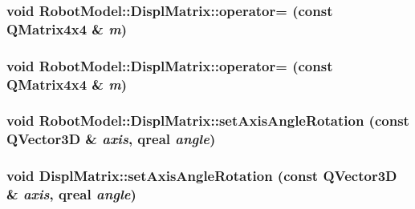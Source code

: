 \label{class_robot_model_1_1_displ_matrix_a337c49b52435255a7f36966c7047f6ff}
\hypertarget{class_robot_model_1_1_displ_matrix_a3baf235c0c2c7eee46506dc2b2114fe2}{
\subsubsection[{operator=}]{\setlength{\rightskip}{0pt plus 5cm}void RobotModel::DisplMatrix::operator= (const QMatrix4x4 \& {\em m})}}
\label{class_robot_model_1_1_displ_matrix_a3baf235c0c2c7eee46506dc2b2114fe2}
\hypertarget{class_robot_model_1_1_displ_matrix_a3baf235c0c2c7eee46506dc2b2114fe2}{
\subsubsection[{operator=}]{\setlength{\rightskip}{0pt plus 5cm}void RobotModel::DisplMatrix::operator= (const QMatrix4x4 \& {\em m})}}
\label{class_robot_model_1_1_displ_matrix_a3baf235c0c2c7eee46506dc2b2114fe2}
\hypertarget{class_robot_model_1_1_displ_matrix_a5f4086efc5ae18846c8f9522b8e19f9f}{
\subsubsection[{setAxisAngleRotation}]{\setlength{\rightskip}{0pt plus 5cm}void RobotModel::DisplMatrix::setAxisAngleRotation (const QVector3D \& {\em axis}, \/  qreal {\em angle})}}
\label{class_robot_model_1_1_displ_matrix_a5f4086efc5ae18846c8f9522b8e19f9f}
\hypertarget{class_robot_model_1_1_displ_matrix_ab976907c6be66c0aee20a24991ce4159}{
\subsubsection[{setAxisAngleRotation}]{\setlength{\rightskip}{0pt plus 5cm}void DisplMatrix::setAxisAngleRotation (const QVector3D \& {\em axis}, \/  qreal {\em angle})}}
